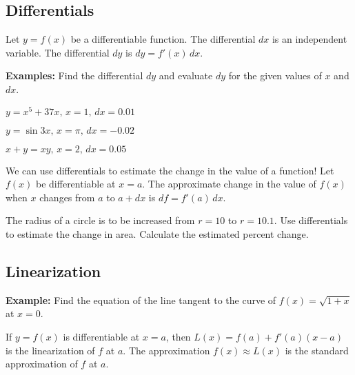 \documentclass[addpoints, 12pt]{exam}
\begin{document}
\newpage
{}
\subsection*{Differentials}
\begin{tcolorbox}[title= DEFINITION OF A DIFFERENTIAL,black,sharp corners,colback=white,colbacktitle=white,coltitle=black,boxrule=1pt]

    Let $y=f(x)$ be a differentiable function. The differential $dx$ is an independent variable. The differential $dy$ is $dy=f'(x)\,dx$.
    
\end{tcolorbox}
\noindent\textbf{Examples:} Find the differential $dy$ and evaluate $dy$ for the given values of $x$ and $dx$.
\begin{questions}
    \question $y=x^5+37x,\,x=1,\,dx=0.01$
    
    \question $y=\sin3x,\,x=\pi,\,dx=-0.02$
    
    \question $x+y=xy,\,x=2,\,dx=0.05$
\end{questions}

We can use differentials to estimate the change in the value of a function! Let $f(x)$ be differentiable at $x=a$. The approximate change in the value of $f(x)$ when $x$ changes from $a$ to $a+dx$ is $df=f'(a)\,dx$.
\begin{questions}
    \setcounter{question}{3}
    \question The radius of a circle is to be increased from $r=10$ to $r=10.1$. Use differentials to estimate the change in area. Calculate the estimated percent change.
\end{questions}

\subsection*{Linearization}
\noindent\textbf{Example:} Find the equation of the line tangent to the curve of $f(x)=\sqrt{1+x}$ at $x=0$.

\begin{tcolorbox}[title= LINEARIZATION,black,sharp corners,colback=white,colbacktitle=white,coltitle=black,boxrule=1pt]

    If $y=f(x)$ is differentiable at $x=a$, then $L(x)=f(a)+f'(a)(x-a)$ is the linearization of $f$ at $a$. The approximation $f(x)\approx L(x)$ is the standard approximation of $f$ at $a$.
    
\end{tcolorbox}
\end{document}
